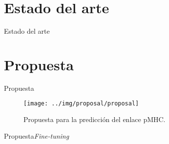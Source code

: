 \documentclass[10pt]{beamer}
\newcommand{\1}{
	\setbeamertemplate{background}{
		\texttt{[image: img/1]}
		\tikz[overlay] \fill[fill opacity=0.75,fill=white] (0,0) rectangle (-\paperwidth,\paperheight);
	}
}
\begin{document}
\section{Estado del arte}

\begin{frame}{Estado del arte}{}	
	
\end{frame}


\section{Propuesta}

\begin{frame}{Propuesta}{}

	\begin{figure}[H]
		\centering
		\texttt{[image: ../img/proposal/proposal]}	
		\caption{Propuesta para la predicción del enlace pMHC.}
		\label{fig:neo_det_seq}
	\end{figure}
\end{frame}


\begin{frame}{Propuesta}{\textit{Fine-tuning}}
	
\end{frame}
\end{document}
